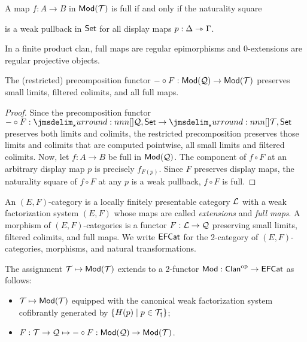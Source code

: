 \documentclass[a4paper]{article}
\begin{document}
\begin{remark}
  A map $f : A \to B$ in $\mathsf{Mod}(\mathcal{T})$ is full if and only if the naturality square
  \begin{center}
  \end{center}
  is a weak pullback in $\mathsf{Set}$ for all display maps $p : \Delta \rightarrowtriangle \Gamma$.
\end{remark}

\begin{remark}
  In a finite product clan, full maps are regular epimorphisms and $0$-extensions are regular projective objects.
\end{remark}

\begin{lemma}
  The (restricted) precomposition functor $- \circ F : \mathsf{Mod}(\mathcal{Q}) \to \mathsf{Mod}(\mathcal{T})$ preserves small limits, filtered colimits, and all full maps.
\end{lemma}
\begin{proof}
  Since the precomposition functor $- \circ F : \funCat{\cQ}{\Set} \to \funCat{\cT}{\Set}$ preserves both limits and colimits, the restricted precomposition preserves those limits and colimits that are computed pointwise, \ie all small limits and filtered colimits.
  Now, let $f : A \to B$ be full in $\mathsf{Mod}(\mathcal{Q})$.
  The component of $f \circ F$ at an arbitrary display map $p$ is precisely $f_{F(p)}$.
  Since $F$ preserves display maps, the naturality square of $f \circ F$ at any $p$ is a weak pullback, \ie $f \circ F$ is full.
\end{proof}

\begin{definition}
  An $(E,F)$-category is a locally finitely presentable category $\mathcal{L}$ with a weak factorization system $(E,F)$ whose maps are called \emph{extensions} and \emph{full maps}.
  A morphism of $(E,F)$-categories is a functor $F : \mathcal{L} \to \mathcal{Q}$ preserving small limits, filtered colimits, and full maps.
  We write $\mathsf{EFCat}$ for the 2-category of $(E,F)$-categories, morphisms, and natural transformations.
\end{definition}

\begin{construction}
  The assignment $\mathcal{T} \mapsto \mathsf{Mod}(\mathcal{T})$ extends to a 2-functor $\mathsf{Mod} : \mathsf{Clan}^{\mathrm{op}} \to \mathsf{EFCat}$ as follows:
  \begin{itemize}
  \item $\mathcal{T} \mapsto \mathsf{Mod}(\mathcal{T})$ equipped with the canonical weak factorization system cofibrantly generated by $\{H(p) \mid p \in \mathcal{T}_{\dag}\}$;
  \item $F : \mathcal{T} \to \mathcal{Q} \mapsto - \circ F : \mathsf{Mod}(\mathcal{Q}) \to \mathsf{Mod}(\mathcal{T})$.
  \end{itemize}
\end{construction}
\end{document}
